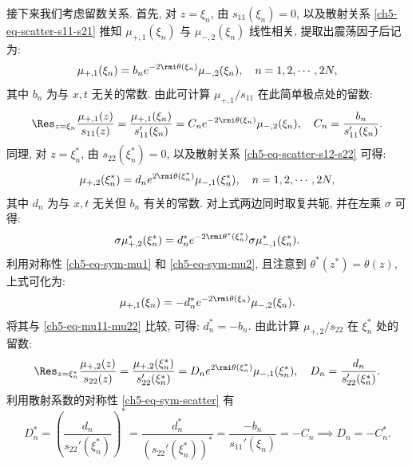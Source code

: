接下来我们考虑留数关系. 首先, 对 $z = \xi_{n}$, 由 $s_{11}(\xi_{n}) = 0$, 以及散射关系 \eqref{ch5-eq-scatter-s11-s21} 推知 $\mu_{+,1}(\xi_{n})$ 与 $\mu_{-,2}(\xi_{n})$ 线性相关, 提取出震荡因子后记为:
\begin{equation}
    \mu_{+,1}(\xi_{n}) = b_{n} e^{-2\rmi \theta(\xi_{n})} \mu_{-,2}(\xi_{n}), \quad n = 1, 2, \cdots, 2 N,
    \label{ch5-eq-mu11-mu22}
\end{equation}
其中 $b_{n}$ 为与 $x, t$ 无关的常数. 由此可计算 $\mu_{+,1}/s_{11}$ 在此简单极点处的留数:
\begin{equation}
    \Res_{z = \xi_{n}} \frac{\mu_{+,1}(z)}{s_{11}(z)} = \frac{\mu_{+, 1}(\xi_{n})}{s_{11}'(\xi_{n})} = C_{n} e^{-2\rmi \theta(\xi_{n})} \mu_{-,2}(\xi_{n}), \quad C_{n} = \frac{b_{n}}{s_{11}'(\xi_{n})}.
    \label{ch5-eq-mu11-res}
\end{equation}
同理, 对 $z = \xi_{n}^{*}$, 由 $s_{22}(\xi_{n}^{*}) = 0$, 以及散射关系 \eqref{ch5-eq-scatter-s12-s22} 可得:
\begin{equation}
    \mu_{+,2}(\xi_{n}^{*}) = d_{n} e^{2\rmi \theta(\xi_{n}^{*})} \mu_{-,1}(\xi_{n}^{*}), \quad n = 1, 2, \cdots, 2 N,
    \label{ch5-eq-mu22-mu11}
\end{equation}
其中 $d_{n}$ 为与 $x, t$ 无关但 $b_n$ 有关的常数. 对上式两边同时取复共轭, 并在左乘 $\sigma$ 可得:
\begin{equation}
    \sigma \mu_{+,2}^{*}(\xi_{n}^{*}) = d_{n}^{*} e^{-2 \rmi \theta^{*}(\xi_{n}^{*})} \sigma \mu_{-,1}^{*}(\xi_{n}^{*}).
\end{equation}
利用对称性 \eqref{ch5-eq-sym-mu1} 和 \eqref{ch5-eq-sym-mu2}, 且注意到 $\theta^{*}(z^{*}) = \theta(z)$, 上式可化为:
\begin{equation}
    \mu_{+, 1}(\xi_{n}) = -d_{n}^{*} e^{-2 \rmi \theta(\xi_{n})} \mu_{-, 2}(\xi_{n}).
\end{equation}
将其与 \eqref{ch5-eq-mu11-mu22} 比较, 可得: $d_{n}^{*} = -b_{n}$. 由此计算 $\mu_{+,2}/s_{22}$ 在 $\xi_n^*$ 处的留数:
\begin{equation}
    \Res_{z = \xi_{n}^{*}} \frac{\mu_{+, 2}(z)}{s_{22}(z)} = \frac{\mu_{+, 2}(\xi_{n}^{*})}{s_{22}'(\xi_{n}^{*})} = D_{n} e^{2\rmi \theta(\xi_{n}^{*})} \mu_{-,1}(\xi_{n}^{*}), \quad D_{n} = \frac{d_{n}}{s_{22}'(\xi_{n}^{*})}.
    \label{ch5-eq-mu22-res}
\end{equation}
利用散射系数的对称性 \eqref{ch5-eq-sym-scatter} 有
\begin{equation}
    D_{n}^{*} = \left( \frac{d_{n}}{s_{22}'(\xi_{n}^{*})} \right)^{*} = \frac{d_{n}^{*}}{(s_{22}'(\xi_{n}^{*}))^{*}} = \frac{-b_{n}}{s_{11}'(\xi_{n})} = -C_{n} \implies D_{n} = -C_{n}^{*}.
\end{equation}
